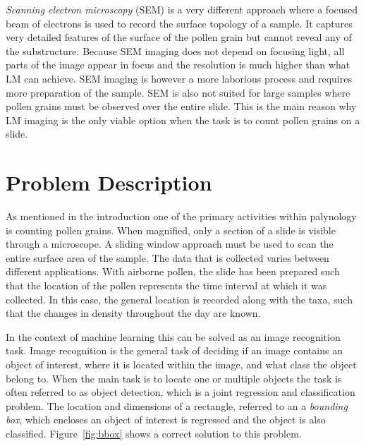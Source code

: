 \textit{Scanning electron microscopy} (SEM) is a very different approach where a focused beam of electrons is used to record the surface topology of a sample.
It captures very detailed features of the surface of the pollen grain but cannot reveal any of the substructure.
Because SEM imaging does not depend on focusing light, all parts of the image appear in focus and the resolution is much higher than what LM can achieve.
SEM imaging is however a more laborious process and requires more preparation of the sample.
SEM is also not suited for large samples where pollen grains must be observed over the entire slide.
This is the main reason why LM imaging is the only viable option when the task is to count pollen grains on a slide.

\section{Problem Description}



As mentioned in the introduction one of the primary activities within palynology is counting pollen grains.
When magnified, only a section of a slide is visible through a microscope.
A sliding window approach must be used to scan the entire surface area of the sample.
The data that is collected varies between different applications.
With airborne pollen, the slide has been prepared such that the location of the pollen represents the time interval at which it was collected.
In this case, the general location is recorded along with the taxa, such that the changes in density throughout the day are known.

In the context of machine learning this can be solved as an image recognition task.
Image recognition is the general task of deciding if an image contains an object of interest, where it is located within the image, and what class the object belong to.
When the main task is to locate one or multiple objects the task is often referred to as object detection, which is a joint regression and classification problem.
The location and dimensions of a rectangle, referred to an a \textit{bounding box}, which encloses an object of interest is regressed and the object is also classified.
Figure~\ref{fig:bbox} shows a correct solution to this problem.

